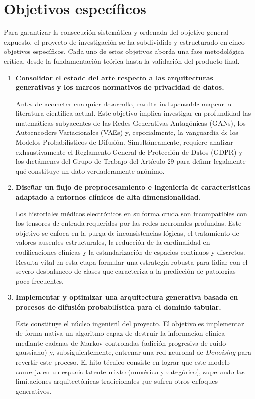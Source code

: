 \section{Objetivos específicos}

Para garantizar la consecución sistemática y ordenada del objetivo general expuesto, el proyecto de investigación se ha subdividido y estructurado en cinco objetivos específicos. Cada uno de estos objetivos aborda una fase metodológica crítica, desde la fundamentación teórica hasta la validación del producto final.

\begin{enumerate}
  \item \textbf{Consolidar el estado del arte respecto a las arquitecturas generativas y los marcos normativos de privacidad de datos.} 
  
  Antes de acometer cualquier desarrollo, resulta indispensable mapear la literatura científica actual. Este objetivo implica investigar en profundidad las matemáticas subyacentes de las Redes Generativas Antagónicas (GANs), los Autoencoders Variacionales (VAEs) y, especialmente, la vanguardia de los Modelos Probabilísticos de Difusión. Simultáneamente, requiere analizar exhaustivamente el Reglamento General de Protección de Datos (GDPR) y los dictámenes del Grupo de Trabajo del Artículo 29 para definir legalmente qué constituye un dato verdaderamente anónimo.

  \item \textbf{Diseñar un flujo de preprocesamiento e ingeniería de características adaptado a entornos clínicos de alta dimensionalidad.}
  
  Los historiales médicos electrónicos en su forma cruda son incompatibles con los tensores de entrada requeridos por las redes neuronales profundas. Este objetivo se enfoca en la purga de inconsistencias lógicas, el tratamiento de valores ausentes estructurales, la reducción de la cardinalidad en codificaciones clínicas y la estandarización de espacios continuos y discretos. Resulta vital en esta etapa formular una estrategia robusta para lidiar con el severo desbalanceo de clases que caracteriza a la predicción de patologías poco frecuentes.

  \item \textbf{Implementar y optimizar una arquitectura generativa basada en procesos de difusión probabilística para el dominio tabular.}
  
  Este constituye el núcleo ingenieril del proyecto. El objetivo es implementar de forma nativa un algoritmo capaz de destruir la información clínica mediante cadenas de Markov controladas (adición progresiva de ruido gaussiano) y, subsiguientemente, entrenar una red neuronal de \textit{Denoising} para revertir este proceso. El hito técnico consiste en lograr que este modelo converja en un espacio latente mixto (numérico y categórico), superando las limitaciones arquitectónicas tradicionales que sufren otros enfoques generativos.


\end{enumerate}
